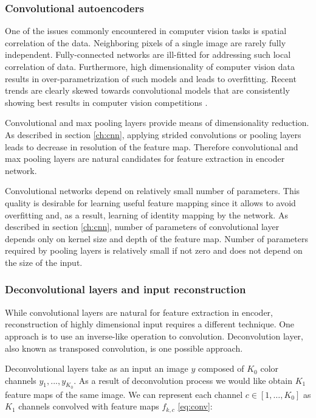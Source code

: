 \subsubsection{Convolutional autoencoders}\label{ch:cae}

One of the issues commonly encountered in computer vision tasks is spatial correlation of the data.
Neighboring pixels of a single image are rarely fully independent.
Fully-connected networks are ill-fitted for addressing such local correlation of data.
Furthermore, high dimensionality of computer vision data results in over-parametrization of such models and leads to overfitting.
Recent trends are clearly skewed towards convolutional models \cite{He2015, Szegedy2016} that are consistently showing best results in computer vision competitions \cite{ILSVRC15, Zhou2016}.

Convolutional and max pooling layers provide means of dimensionality reduction.
As described in section \ref{ch:cnn}, applying strided convolutions or pooling layers leads to decrease in resolution of the feature map.
Therefore convolutional and max pooling layers are natural candidates for feature extraction in encoder network.

Convolutional networks depend on relatively small number of parameters.
This quality is desirable for learning useful feature mapping since it allows to avoid overfitting and, as a result, learning of identity mapping by the network.
As described in section \ref{ch:cnn}, number of parameters of convolutional layer depends only on kernel size and depth of the feature map.
Number of parameters required by pooling layers is relatively small if not zero and does not depend on the size of the input.

\subsubsection{Deconvolutional layers and input reconstruction}

While convolutional layers are natural for feature extraction in encoder, reconstruction of highly dimensional input requires a different technique.
One approach is to use an inverse-like operation to convolution.
Deconvolution layer, also known as transposed convolution, is one possible approach.

Deconvolutional layers \cite{Zeiler2010} take as an input an image $y$ composed of $K_0$ color channels $y_1, ... , y_{K_0}$.
As a result of deconvolution process we would like obtain $K_1$ feature maps of the same image.
We can represent each channel $c \in [1, \ldots, K_0]$ as $K_1$ channels convolved with feature maps $f_{k,c}$ \ref{eq:conv}:

